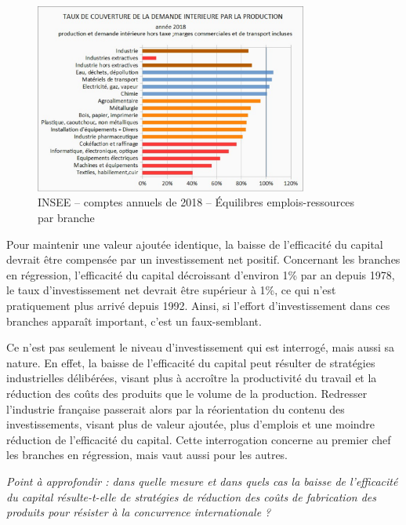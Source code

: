 \documentclass[a4paper]{article}
\begin{document}
\begin{figure}[H]
    \centering
    \includegraphics*[width=0.8\textwidth]{images/couverture}
    \caption{INSEE – comptes annuels de 2018 – Équilibres emplois-ressources par branche}
    \label{fig:couverture}
\end{figure}

Pour maintenir une valeur ajoutée identique, la baisse de l’efficacité du capital devrait être compensée par un investissement net positif. Concernant les branches en régression, l’efficacité du capital décroissant d’environ 1\% par an depuis 1978, le taux d’investissement net devrait être supérieur à 1\%, ce qui n’est pratiquement plus arrivé depuis 1992. Ainsi, si l’effort d’investissement dans ces branches apparaît important, c’est un faux-semblant. 

Ce n’est pas seulement le niveau d’investissement qui est interrogé, mais aussi sa nature. En effet,  la baisse de l’efficacité du capital peut résulter de stratégies industrielles délibérées, visant plus à accroître la productivité du travail et la réduction des coûts des produits que le volume de la production. Redresser l’industrie française passerait alors par la réorientation du contenu des investissements, visant plus de valeur ajoutée, plus d’emplois et une moindre réduction de l’efficacité du capital. Cette interrogation concerne au premier chef les branches en régression, mais vaut aussi pour les autres.  

\textit{Point à approfondir : dans quelle mesure et dans quels cas la baisse de l’efficacité du capital résulte-t-elle de stratégies de réduction des coûts de fabrication des produits pour résister à la concurrence internationale ?}
\end{document}

